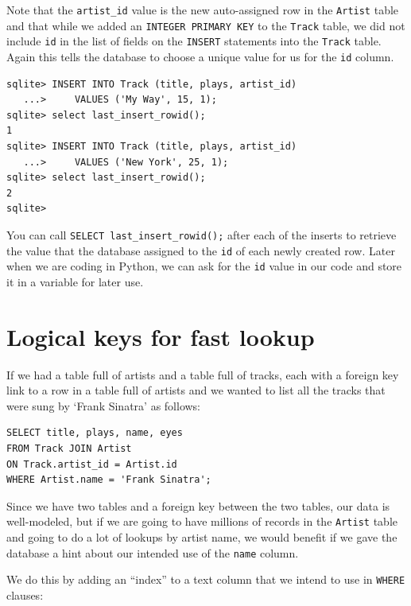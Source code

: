 \documentclass[10pt,]{book}
\begin{document}
Note that the \texttt{artist\_id} value is the new auto-assigned row in
the \texttt{Artist} table and that while we added an
\texttt{INTEGER\ PRIMARY\ KEY} to the \texttt{Track} table, we did not
include \texttt{id} in the list of fields on the \texttt{INSERT}
statements into the \texttt{Track} table. Again this tells the database
to choose a unique value for us for the \texttt{id} column.

{\small
\begin{verbatim}
sqlite> INSERT INTO Track (title, plays, artist_id)
   ...>     VALUES ('My Way', 15, 1);
sqlite> select last_insert_rowid();
1
sqlite> INSERT INTO Track (title, plays, artist_id)
   ...>     VALUES ('New York', 25, 1);
sqlite> select last_insert_rowid();
2
sqlite>
\end{verbatim}
}

 You can call
\texttt{SELECT\ last\_insert\_rowid();} after each of the inserts to
retrieve the value that the database assigned to the \texttt{id} of each
newly created row. Later when we are coding in Python, we can ask for
the \texttt{id} value in our code and store it in a variable for later
use.

\section{Logical keys for fast
lookup}\label{logical-keys-for-fast-lookup}

  If we had a table full of artists
and a table full of tracks, each with a foreign key link to a row in a
table full of artists and we wanted to list all the tracks that were
sung by `Frank Sinatra' as follows:

{\small
\begin{verbatim}
SELECT title, plays, name, eyes
FROM Track JOIN Artist
ON Track.artist_id = Artist.id
WHERE Artist.name = 'Frank Sinatra';
\end{verbatim}
}

Since we have two tables and a foreign key between the two tables, our
data is well-modeled, but if we are going to have millions of records in
the \texttt{Artist} table and going to do a lot of lookups by artist
name, we would benefit if we gave the database a hint about our intended
use of the \texttt{name} column.

 We do this by adding an ``index'' to a text column
that we intend to use in \texttt{WHERE} clauses:
\end{document}
